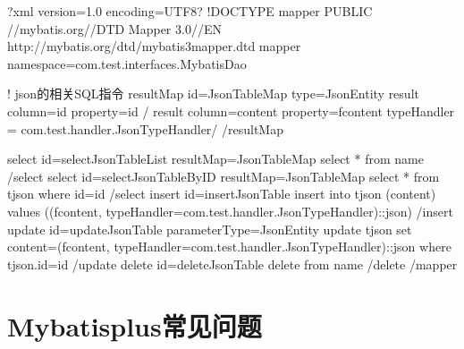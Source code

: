 \documentclass[a4,10pt,oneside,english]{sphinxmanual}
\begin{document}
\begin{sphinxVerbatim}[commandchars=\\\{\}]
\PYGZlt{}?xml version=\PYGZdq{}1.0\PYGZdq{} encoding=\PYGZdq{}UTF\PYGZhy{}8\PYGZdq{}?\PYGZgt{}
\PYGZlt{}!DOCTYPE mapper
PUBLIC \PYGZdq{}\PYGZhy{}//mybatis.org//DTD Mapper 3.0//EN\PYGZdq{}
\PYGZdq{}http://mybatis.org/dtd/mybatis\PYGZhy{}3\PYGZhy{}mapper.dtd\PYGZdq{}\PYGZgt{}
\PYGZlt{}mapper namespace=\PYGZdq{}com.test.interfaces.MybatisDao\PYGZdq{}\PYGZgt{}


   \PYGZlt{}!\PYGZhy{}\PYGZhy{} json的相关SQL指令 \PYGZhy{}\PYGZhy{}\PYGZgt{}
   \PYGZlt{}resultMap id=\PYGZdq{}JsonTableMap\PYGZdq{} type=\PYGZdq{}JsonEntity\PYGZdq{}\PYGZgt{}
       \PYGZlt{}result column=\PYGZdq{}id\PYGZdq{} property=\PYGZdq{}id\PYGZdq{} /\PYGZgt{}
       \PYGZlt{}result column=\PYGZdq{}content\PYGZdq{} property=\PYGZdq{}fcontent\PYGZdq{} typeHandler = \PYGZdq{}com.test.handler.JsonTypeHandler\PYGZdq{}/\PYGZgt{}
   \PYGZlt{}/resultMap\PYGZgt{}

   \PYGZlt{}select id=\PYGZdq{}selectJsonTableList\PYGZdq{} resultMap=\PYGZdq{}JsonTableMap\PYGZdq{}\PYGZgt{}
      select * from \PYGZdl{}\PYGZob{}name\PYGZcb{}
   \PYGZlt{}/select\PYGZgt{}
   \PYGZlt{}select id=\PYGZdq{}selectJsonTableByID\PYGZdq{} resultMap=\PYGZdq{}JsonTableMap\PYGZdq{}\PYGZgt{}
      select * from t\PYGZus{}json where id=\PYGZsh{}\PYGZob{}id\PYGZcb{}
   \PYGZlt{}/select\PYGZgt{}
    \PYGZlt{}insert id=\PYGZdq{}insertJsonTable\PYGZdq{}\PYGZgt{}
        insert into t\PYGZus{}json (content) values ((\PYGZsh{}\PYGZob{}fcontent, typeHandler=com.test.handler.JsonTypeHandler\PYGZcb{})::json)
    \PYGZlt{}/insert\PYGZgt{}
    \PYGZlt{}update id=\PYGZdq{}updateJsonTable\PYGZdq{} parameterType=\PYGZdq{}JsonEntity\PYGZdq{} \PYGZgt{}
        update t\PYGZus{}json set content=(\PYGZsh{}\PYGZob{}fcontent, typeHandler=com.test.handler.JsonTypeHandler\PYGZcb{})::json where t\PYGZus{}json.id=\PYGZsh{}\PYGZob{}id\PYGZcb{}
    \PYGZlt{}/update\PYGZgt{}
    \PYGZlt{}delete id=\PYGZdq{}deleteJsonTable\PYGZdq{}\PYGZgt{}
        delete from \PYGZdl{}\PYGZob{}name\PYGZcb{}
    \PYGZlt{}/delete\PYGZgt{}
\PYGZlt{}/mapper\PYGZgt{}
\end{sphinxVerbatim}


\section{Mybatis\sphinxhyphen{}plus常见问题}
\label{\detokenize{interface/mybatis-plus:mybatis-plus}}\label{\detokenize{interface/mybatis-plus::doc}}
\end{document}
